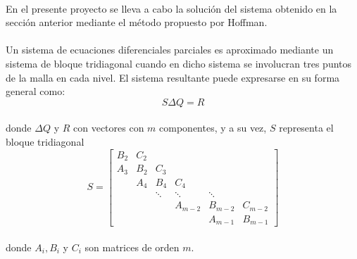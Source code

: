 \documentclass[letterpaper, openright, 12pt]{book}
\begin{document}
    \paragraph*{}
        En el presente proyecto se lleva a cabo la solución del sistema obtenido
        en la sección anterior mediante el método propuesto por
        Hoffman\cite{hoffmann2000computational}.
    \paragraph*{}
        Un sistema de ecuaciones diferenciales parciales es aproximado mediante
        un sistema de bloque tridiagonal cuando en dicho sistema se involucran
        tres puntos de la malla en cada nivel. El sistema resultante puede
        expresarse en su forma general como:
        \begin{equation}
            S \Delta Q = R
            \label{hyper-sol-1}
        \end{equation}\\
        donde $\Delta Q$ y $R$ con vectores con $m$ componentes, y a su vez, $S$
        representa el bloque tridiagonal
        \begin{equation*}
            S = \begin{bmatrix}
            B_2 & C_2\\
            A_3 & B_2 & C_3\\
            & A_4 & B_4 & C_4\\
            & & \ddots & \ddots & \ddots\\
            & & & A_{m-2} & B_{m-2} & C_{m-2}\\
            & & & & A_{m-1} & B_{m-1}
            \end{bmatrix}
        \end{equation*}\\
        donde $A_i, B_i$ y $C_i$ son matrices de orden $m$.
\end{document}
